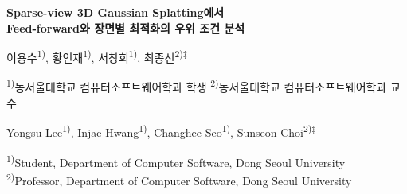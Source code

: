 \begin{center}
{\LARGE\bfseries Sparse-view 3D Gaussian Splatting에서\\
Feed-forward와 장면별 최적화의 우위 조건 분석\par}
\vspace{0.9em}

{\normalsize 이용수\textsuperscript{1)}, 황인재\textsuperscript{1)}, 서창희\textsuperscript{1)}, 최종선\textsuperscript{2)‡}\par}
\vspace{0.25em}
{\small \textsuperscript{1)}동서울대학교 컴퓨터소프트웨어학과 학생
\quad \textsuperscript{2)}동서울대학교 컴퓨터소프트웨어학과 교수\par}
\vspace{0.6em}

{\normalsize Yongsu Lee\textsuperscript{1)}, Injae Hwang\textsuperscript{1)}, Changhee Seo\textsuperscript{1)}, Sunseon Choi\textsuperscript{2)‡}\par}
\vspace{0.25em}
{\small \textsuperscript{1)}Student, Department of Computer Software, Dong Seoul University\\
\textsuperscript{2)}Professor, Department of Computer Software, Dong Seoul University\par}
\end{center}

\vspace{0.6em}


